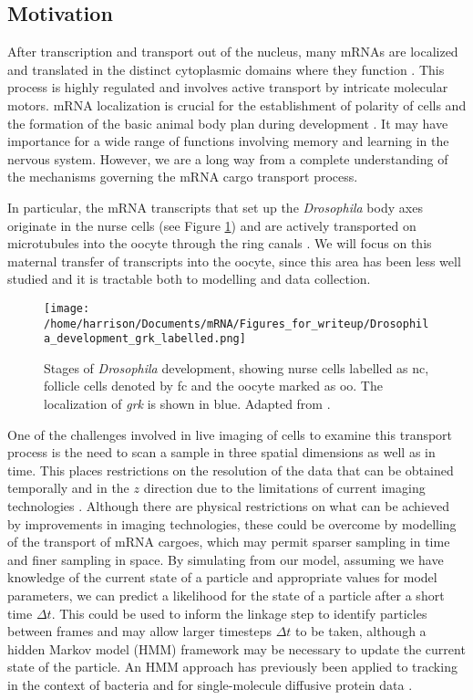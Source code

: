 \documentclass[twocolumn]{biophys}
\begin{document}
\subsection{Motivation}
After transcription and transport out of the nucleus, many mRNAs are localized and translated in the distinct cytoplasmic domains where they function \citep{jansen2001mrna, parton2014subcellular}.
This process is highly regulated and involves active transport by intricate molecular motors.
mRNA localization is crucial for the establishment of polarity of cells and the formation of the basic animal body plan during development \citep{wolpert1998}. 
It may have importance for a wide range of functions involving memory and learning in the nervous system. 
However, we are a long way from a complete understanding of the mechanisms governing the mRNA cargo transport process.

In particular, the mRNA transcripts that set up the \textit{Drosophila} body axes originate in the nurse cells (see Figure \ref{FIG:Drosophila_development}) and are actively transported on microtubules into the oocyte through the ring canals \citep{clark2007dynein}.
We will focus on this maternal transfer of transcripts into the oocyte, since this area has been less well studied and it is tractable both to modelling and data collection.
\begin{figure}[h]
 \centering
 \texttt{[image: /home/harrison/Documents/mRNA/Figures\_for\_writeup/Drosophila\_development\_grk\_labelled.png]}
 \caption{Stages of \textit{Drosophila} development, showing nurse cells labelled as nc, follicle cells denoted by fc and the oocyte marked as oo. The localization of \textit{grk} is shown in blue. Adapted from \citet{lasko1999rna}.}
 \label{FIG:Drosophila_development}
\end{figure}

One of the challenges involved in live imaging of cells to examine this transport process is the need to scan a sample in three spatial dimensions as well as in time.
This places restrictions on the resolution of the data that can be obtained temporally and in the $z$ direction due to the limitations of current imaging technologies \citep{weil2010making}.
Although there are physical restrictions on what can be achieved by improvements in imaging technologies, these could be overcome by modelling of the transport of mRNA cargoes, which may permit sparser sampling in time and finer sampling in space.
By simulating from our model, assuming we have knowledge of the current state of a particle and appropriate values for model parameters, we can predict a likelihood for the state of a particle after a short time $\Delta t$.
This could be used to inform the linkage step to identify particles between frames and may allow larger timesteps $\Delta t$ to be taken, although a hidden Markov model (HMM) framework may be necessary to update the current state of the particle.
An HMM approach has previously been applied to tracking in the context of bacteria \citep{rosser2013novel} and for single-molecule diffusive protein data \citep{persson2013extracting}.
\end{document}
